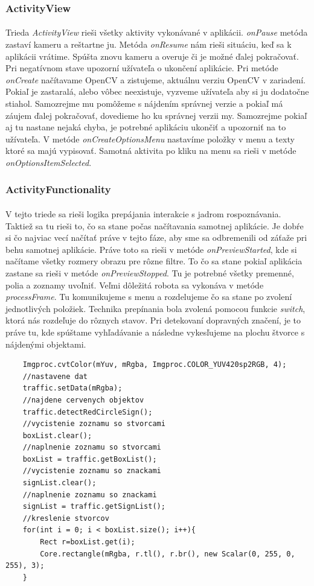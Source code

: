 \documentclass[12pt]{article}
\begin{document}
\subsubsection{ActivityView}
\paragraph{}
Trieda \emph{ActivityView} rieši všetky aktivity vykonávané v aplikácii. \emph{onPause} metóda zastaví kameru a reštartne ju. Metóda \emph{onResume} nám rieši situáciu, keď sa k aplikácii vrátime.
Spúšta znovu kameru a overuje či je možné ďalej pokračovať. Pri negatívnom stave upozorní užívateľa o ukončení aplikácie. Pri metóde \emph{onCreate} načítavame OpenCV a zistujeme, aktuálnu verziu OpenCV v zariadení.
Pokiaľ je zastaralá, alebo vôbec neexistuje, vyzveme užívateľa aby si ju dodatočne stiahol. Samozrejme mu pomôžeme s nájdením správnej verzie a pokiaľ má záujem ďalej pokračovať, dovedieme ho ku správnej verzii my.
Samozrejme pokiaľ aj tu nastane nejaká chyba, je potrebné aplikáciu ukončiť a upozorniť na to užívateľa. V metóde \emph{onCreateOptionsMenu} nastavíme položky v menu a texty ktoré sa majú vypisovať. 
Samotná aktivita po kliku na menu sa rieši v metóde \emph{onOptionsItemSelected}.
\subsubsection{ActivityFunctionality}
\paragraph{}
V tejto triede sa rieši logika prepájania interakcie s jadrom rospoznávania. Taktiež sa tu rieši to, čo sa stane počas načítavania samotnej aplikácie.
Je dobŕe si čo najviac vecí načítať práve v tejto fáze, aby sme sa odbremenili od záťaže pri behu samotnej aplikácie. Práve toto sa rieši v metóde \emph{onPreviewStarted}, kde si načítame všetky rozmery obrazu pre rôzne filtre.
To čo sa stane pokiaľ aplikácia zastane sa rieši v metóde \emph{onPreviewStopped}. Tu je potrebné všetky premenné, polia a zoznamy uvoľniť. Veľmi dôležitá robota sa vykonáva v metóde \emph{processFrame}.
Tu komunikujeme s menu a rozdelujeme čo sa stane po zvolení jednotlivých položiek. Technika prepínania bola zvolená pomocou funkcie \emph{switch}, ktorá nás rozdeľuje do rôznych stavov. Pri detekovaní dopravných značení, je to práve tu, kde spúštame vyhľadávanie a následne vykesľujeme na plochu štvorce s nájdenými objektami.
\begin{lstlisting}
	Imgproc.cvtColor(mYuv, mRgba, Imgproc.COLOR_YUV420sp2RGB, 4);
	//nastavene dat
	traffic.setData(mRgba);
	//najdene cervenych objektov
	traffic.detectRedCircleSign();
	//vycistenie zoznamu so stvorcami
	boxList.clear();
	//naplnenie zoznamu so stvorcami
	boxList = traffic.getBoxList();
	//vycistenie zoznamu so znackami
	signList.clear();
	//naplnenie zoznamu so znackami
	signList = traffic.getSignList();
	//kreslenie stvorcov
	for(int i = 0; i < boxList.size(); i++){
		Rect r=boxList.get(i);
		Core.rectangle(mRgba, r.tl(), r.br(), new Scalar(0, 255, 0, 255), 3);
	}
\end{lstlisting}
\end{document}
